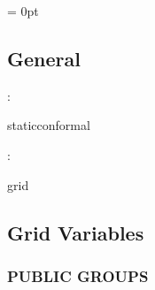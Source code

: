 \documentclass{article}
\begin{document}
\parskip = 0pt

\vspace{3mm} \subsection*{General}

: 

staticconformal
\vspace{2mm}

: 

grid
\vspace{2mm}
\subsection*{Grid Variables}
\vspace{5mm}\subsubsection{PUBLIC GROUPS}

\vspace{5mm}
\end{document}
